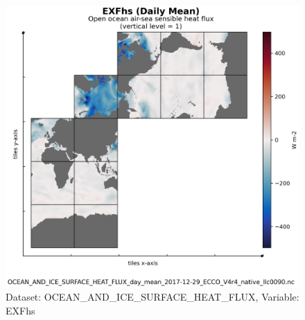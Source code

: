 \begin{figure}[H]
\centering
\includegraphics[scale=0.55]{../images/plots/v4r4/native_plots/Ocean_and_Sea-Ice_Surface_Heat_Fluxes/EXFhs.png}
\caption{Dataset: OCEAN\_AND\_ICE\_SURFACE\_HEAT\_FLUX, Variable: EXFhs}
\label{tab:table-OCEAN_AND_ICE_SURFACE_HEAT_FLUX_EXFhs-Plot}
\end{figure}
\newpage
\pagebreak
